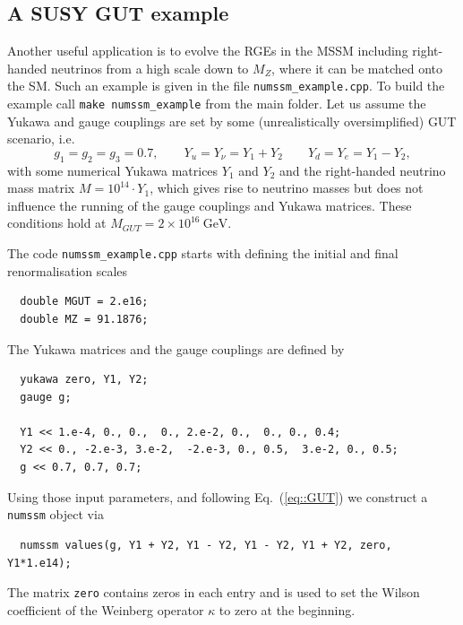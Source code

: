\documentclass[preprint,12pt]{elsarticle}
\begin{document}
\subsection{\label{sec::mssm_example} A SUSY GUT example}
Another useful application is to evolve the RGEs in the MSSM including right-handed neutrinos from a high scale down to $M_Z$, where it can be matched onto the SM. Such an example is given in the file \texttt{numssm\_example.cpp}.
To build the example call \texttt{make numssm\_example} from the main folder.
Let us assume the Yukawa and gauge couplings are set by some (unrealistically oversimplified) GUT scenario, i.e.
\begin{equation}
g_1 = g_2 = g_3 = 0.7, \qquad Y_u = Y_\nu = Y_1 + Y_2 \qquad Y_d = Y_e = Y_1 - Y_2, 
\label{eq::GUT}
\end{equation}
with some numerical Yukawa matrices $Y_1$ and $Y_2$ and the right-handed neutrino mass matrix $M = 10^{14}\cdot Y_1$, which gives rise to neutrino masses but
does not influence the running of the gauge couplings and Yukawa matrices. These conditions hold at $M_{GUT} = 2\times 10^{16}\ \mathrm{GeV}$.


The code \texttt{numssm\_example.cpp} starts with defining the initial and final renormalisation scales
\begin{lstlisting}
  double MGUT = 2.e16;
  double MZ = 91.1876;
\end{lstlisting}
The Yukawa matrices and the gauge couplings are defined by
\begin{lstlisting}
  yukawa zero, Y1, Y2;
  gauge g;

  Y1 << 1.e-4, 0., 0.,  0., 2.e-2, 0.,  0., 0., 0.4;
  Y2 << 0., -2.e-3, 3.e-2,  -2.e-3, 0., 0.5,  3.e-2, 0., 0.5;
  g << 0.7, 0.7, 0.7;
\end{lstlisting}
Using those input parameters, and following Eq.~(\ref{eq::GUT}) we construct a \texttt{numssm} object via
\begin{lstlisting}
  numssm values(g, Y1 + Y2, Y1 - Y2, Y1 - Y2, Y1 + Y2, zero, Y1*1.e14); 
\end{lstlisting}
The matrix \texttt{zero} contains zeros in each entry and is used to set the Wilson coefficient of the Weinberg operator $\kappa$ to zero at the beginning.
 
\end{document}

